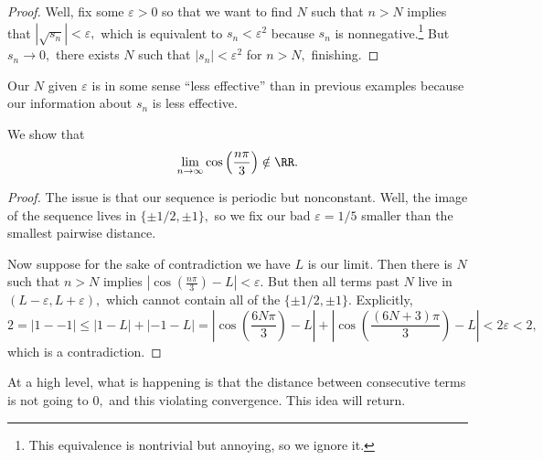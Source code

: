 \begin{proof}
	Well, fix some $\varepsilon>0$ so that we want to find $N$ such that $n>N$ implies that $|\sqrt{s_n}|<\varepsilon,$ which is equivalent to $s_n<\varepsilon^2$ because $s_n$ is nonnegative.\footnote{This equivalence is nontrivial but annoying, so we ignore it.} But $s_n\to0,$ there exists $N$ such that $|s_n|<\varepsilon^2$ for $n>N,$ finishing.
\end{proof}
\begin{remark}
	Our $N$ given $\varepsilon$ is in some sense ``less effective'' than in previous examples because our information about $s_n$ is less effective.
\end{remark}
\begin{exercise}
	We show that
	\[\lim_{n\to\infty}\cos\left(\frac{n\pi}3\right)\notin\RR.\]
\end{exercise}
\begin{proof}
	The issue is that our sequence is periodic but nonconstant. Well, the image of the sequence lives in $\{\pm1/2,\pm1\},$ so we fix our bad $\varepsilon=1/5$ smaller than the smallest pairwise distance.

	Now suppose for the sake of contradiction we have $L$ is our limit. Then there is $N$ such that $n>N$ implies $\left|\cos\left(\frac{n\pi}3\right)-L\right|<\varepsilon.$ But then all terms past $N$ live in $(L-\varepsilon,L+\varepsilon),$ which cannot contain all of the $\{\pm1/2,\pm1\}.$ Explicitly,
	\[2=|1--1|\le|1-L|+|-1-L|=\left|\cos\left(\frac{6N\pi}3\right)-L\right|+\left|\cos\left(\frac{(6N+3)\pi}3\right)-L\right|<2\varepsilon<2,\]
	which is a contradiction.
\end{proof}
\begin{remark}
	At a high level, what is happening is that the distance between consecutive terms is not going to $0,$ and this violating convergence. This idea will return. 
\end{remark}